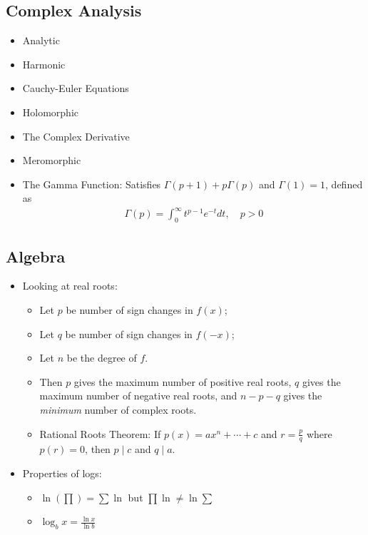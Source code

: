 \hypertarget{complex-analysis-1}{%
\subsection{Complex Analysis}\label{complex-analysis-1}}

\begin{itemize}
\tightlist
\item
  Analytic
\item
  Harmonic
\item
  Cauchy-Euler Equations
\item
  Holomorphic
\item
  The Complex Derivative
\item
  Meromorphic
\item
  The Gamma Function: Satisfies \(\Gamma(p+1) + p\Gamma(p)\) and
  \(\Gamma(1) = 1\), defined as
  \begin{align*}
  \Gamma ( p ) = \int _ { 0 } ^ { \infty } t ^ { p - 1 } e ^ { - t } d t , \quad p > 0
  \end{align*}
\end{itemize}

\hypertarget{algebra-1}{%
\subsection{Algebra}\label{algebra-1}}

\begin{itemize}
\item
  Looking at real roots:

  \begin{itemize}
  \tightlist
  \item
    Let \(p\) be number of sign changes in \(f(x)\);
  \item
    Let \(q\) be number of sign changes in \(f(-x)\);
  \item
    Let \(n\) be the degree of \(f\).
  \item
    Then \(p\) gives the maximum number of positive real roots, \(q\)
    gives the maximum number of negative real roots, and \(n-p-q\) gives
    the \emph{minimum} number of complex roots.
  \item
    Rational Roots Theorem: If \(p(x) = ax^n +\cdots + c\) and
    \(r = \frac{p}{q}\) where \(p(r) = 0\), then \(p \mid c\) and
    \(q \mid a\).
  \end{itemize}
\item
  Properties of logs:

  \begin{itemize}
  \tightlist
  \item
    \(\ln(\prod) = \sum \ln\) but \(\prod \ln \neq \ln \sum\)
  \item
    \(\log_b x = \frac{\ln x}{\ln b}\)
  \end{itemize}
\end{itemize}

